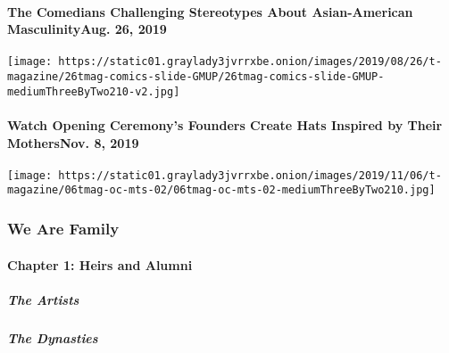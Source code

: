 \hypertarget{the-comedians-challenging-stereotypes-about-asian-american-masculinityaug-26-2019}{%
\paragraph{The Comedians Challenging Stereotypes About Asian-American
MasculinityAug. 26,
2019}\label{the-comedians-challenging-stereotypes-about-asian-american-masculinityaug-26-2019}}

\texttt{[image: https://static01.graylady3jvrrxbe.onion/images/2019/08/26/t-magazine/26tmag-comics-slide-GMUP/26tmag-comics-slide-GMUP-mediumThreeByTwo210-v2.jpg]}
\href{https://www.nytimes3xbfgragh.onion/2019/11/08/t-magazine/opening-ceremony-hats.html}{}

\hypertarget{watch-opening-ceremonys-founders-create-hats-inspired-by-their-mothersnov-8-2019}{%
\paragraph{Watch Opening Ceremony's Founders Create Hats Inspired by
Their MothersNov. 8,
2019}\label{watch-opening-ceremonys-founders-create-hats-inspired-by-their-mothersnov-8-2019}}

\texttt{[image: https://static01.graylady3jvrrxbe.onion/images/2019/11/06/t-magazine/06tmag-oc-mts-02/06tmag-oc-mts-02-mediumThreeByTwo210.jpg]}

\hypertarget{we-are-family-1}{%
\subsubsection{We Are Family}\label{we-are-family-1}}

\hypertarget{chapter-1-heirs-and-alumni}{%
\paragraph{Chapter 1: Heirs and
Alumni}\label{chapter-1-heirs-and-alumni}}

\href{/interactive/2020/04/13/t-magazine/black-art-galleries.html}{}

\hypertarget{the-artists}{%
\subparagraph{The Artists}\label{the-artists}}

\href{/interactive/2020/04/13/t-magazine/italian-fashion-design-houses.html}{}

\hypertarget{the-dynasties}{%
\subparagraph{The Dynasties}\label{the-dynasties}}

\href{/interactive/2020/04/13/t-magazine/gordon-parks.html}{}

